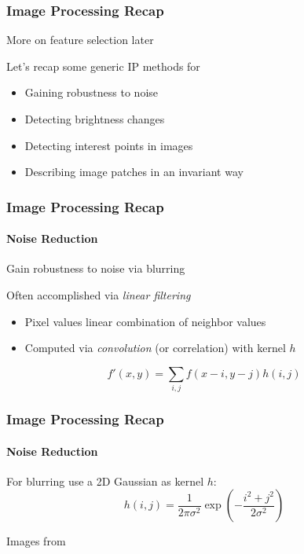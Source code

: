 \documentclass[xetex,professionalfont]{beamer}
\begin{document}

\begin{frame}
\frametitle{Image Processing Recap}

More on feature selection later

\bigskip
Let's recap some generic IP methods for
\begin{itemize}
    \item Gaining robustness to noise
    \item Detecting brightness changes
    \item Detecting interest points in images
    \item Describing image patches in an invariant way
\end{itemize}

\end{frame}


\begin{frame}
\frametitle{Image Processing Recap}
\framesubtitle{Noise Reduction}

Gain robustness to noise via blurring

\bigskip
Often accomplished via \emph{linear filtering}
\begin{itemize}
    \item Pixel values linear combination of neighbor values
    \item Computed via \emph{convolution} (or correlation) with kernel $h$
\end{itemize}

\[
f'(x,y) = \sum_{i,j}f(x-i,y-j)h(i,j) %
\]

\end{frame}


\begin{frame}
\frametitle{Image Processing Recap}
\framesubtitle{Noise Reduction}

For blurring use a 2D Gaussian as kernel $h$: %
\[
h(i,j)=\frac{1}{2\pi\sigma^2}\exp\left(-\frac{i^2+j^2}{2\sigma^2}\right)
\]

\begin{center}
    {\centering Images from \cite{prince12}}
\end{center}

\end{frame}
\end{document}
